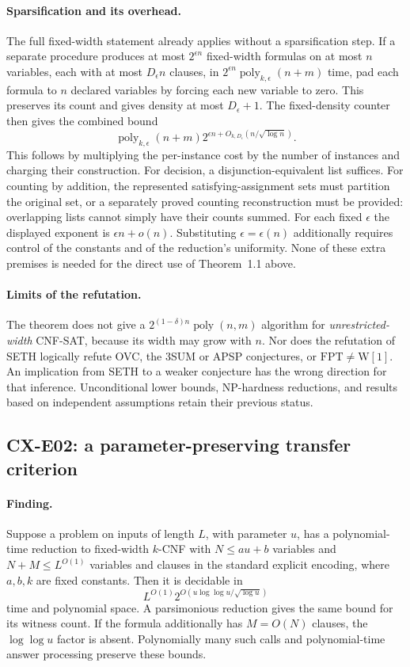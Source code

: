 \documentclass[11pt,a4paper]{article}
\begin{document}
\paragraph{Sparsification and its overhead.}
The full fixed-width statement already applies without a sparsification
step. If a separate procedure produces at most \(2^{\epsilon n}\)
fixed-width formulas on at most \(n\) variables, each with at most
\(D_\epsilon n\) clauses, in
\(2^{\epsilon n}\operatorname{poly}_{k,\epsilon}(n+m)\) time,
pad each formula to \(n\) declared variables by forcing each new
variable to zero. This preserves its count and gives density at most
\(D_\epsilon+1\).
The fixed-density counter then gives the combined bound
\[
 \operatorname{poly}_{k,\epsilon}(n+m)
 2^{\epsilon n+O_{k,D_\epsilon}(n/\sqrt{\log n})}.
\]
This follows by multiplying the per-instance cost by the number of
instances and charging their construction.
For decision, a disjunction-equivalent list suffices.
For counting by addition, the represented satisfying-assignment sets
must partition the original set, or a separately proved counting
reconstruction must be provided: overlapping lists cannot simply
have their counts summed.
For each fixed \(\epsilon\) the displayed exponent is
\(\epsilon n+o(n)\).
Substituting \(\epsilon=\epsilon(n)\) additionally requires control of
the constants and of the reduction's uniformity.
None of these extra premises is needed for the direct use of
Theorem~1.1 above.

\paragraph{Limits of the refutation.}
The theorem does not give a
\(2^{(1-\delta)n}\operatorname{poly}(n,m)\) algorithm for
\emph{unrestricted-width} CNF-SAT, because its width may grow with \(n\).
Nor does the refutation of SETH logically refute OVC, the 3SUM or APSP
conjectures, or \(\mathrm{FPT}\ne\mathrm{W[1]}\).
An implication from SETH to a weaker conjecture has the wrong direction
for that inference. Unconditional lower bounds, NP-hardness
reductions, and results based on independent assumptions retain their
previous status.

\subsection{CX-E02: a parameter-preserving transfer criterion}
\label{finding:CX-E02}

\paragraph{Finding.}
Suppose a problem on inputs of length \(L\), with parameter \(u\),
has a polynomial-time reduction to fixed-width \(k\)-CNF with
\(N\leq au+b\) variables and \(N+M\leq L^{O(1)}\) variables and clauses
in the standard explicit encoding, where
\(a,b,k\) are fixed constants. Then it is decidable in
\[
 L^{O(1)}
 2^{O(u\log\log u/\sqrt{\log u})}
\]
time and polynomial space.
A parsimonious reduction gives the same bound for its witness count.
If the formula additionally has \(M=O(N)\) clauses, the
\(\log\log u\) factor is absent. Polynomially many such calls and
polynomial-time answer processing preserve these bounds.
\end{document}
